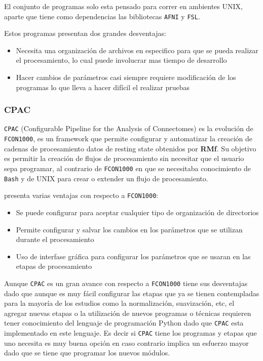 \documentclass{article}
\begin{document}
El conjunto de programas solo esta pensado para correr en ambientes UNIX, aparte que tiene como dependencias las bibliotecas \texttt{AFNI} y \texttt{FSL}.

Estos programas presentan dos grandes desventajas:

\begin{itemize}
  \item{Necesita una organización de archivos en especifico para que se pueda realizar el procesamiento, lo cual puede involucrar mas tiempo de desarrollo}
  \item{Hacer cambios de parámetros casi siempre requiere modificación de los programas lo que lleva a hacer difícil el realizar pruebas}
\end{itemize}

\subsubsection{CPAC}

\texttt{CPAC} (Configurable Pipeline for the Analysis of Connectomes) es la evolución de \texttt{FCON1000}, es un framework que permite configurar y automatizar la creación de cadenas de procesamiento datos de resting state obtenidos por \textbf{RMf}.
Su objetivo es permitir la creación de flujos de procesamiento sin necesitar que el usuario sepa programar, al contrario de \texttt{FCON1000} en que se necesitaba conocimiento de \texttt{Bash} y de UNIX para crear o extender un flujo de procesamiento.

 presenta varias ventajas con respecto a \texttt{FCON1000}:
\begin{itemize}
\item Se puede configurar para aceptar cualquier tipo
  de organización de directorios
\item{Permite configurar y salvar los cambios en los parámetros que se utilizan durante el procesamiento}
\item{Uso de interfase gráfica para configurar los parámetros que se usaran en las etapas de procesamiento}
\end{itemize}

Aunque \texttt{CPAC} es un gran avance con respecto a \texttt{FCON1000} tiene sus desventajas dado que aunque es muy fácil configurar las etapas que ya se tienen contempladas para la mayoría de los estudios como la normalización, suavización, etc, el agregar nuevas etapas o la utilización de nuevos programas o técnicas requieren tener conocimiento del lenguaje de programación Python dado que \texttt{CPAC} esta implementado en este lenguaje. Es decir si \texttt{CPAC} tiene los programas y etapas que uno necesita es muy buena opción en caso contrario implica un esfuerzo mayor dado que se tiene que programar los nuevos módulos.
\end{document}
